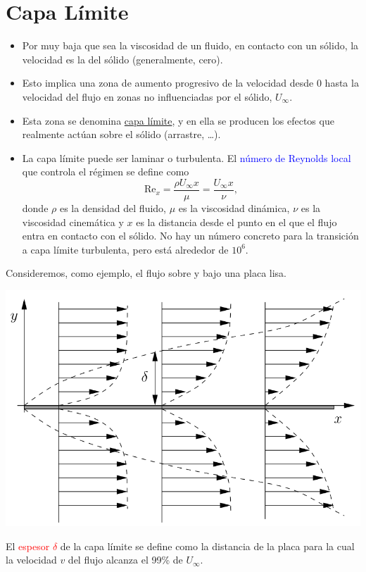 \chapter{Capa Límite}
	
	\begin{itemize}
		\item Por muy baja que sea la viscosidad de un fluido, en contacto con un
		sólido, la velocidad es la del sólido (generalmente, cero).
		\item Esto implica una zona de aumento progresivo de la velocidad desde
		0 hasta la velocidad del flujo en zonas no influenciadas por el sólido,
		$U_{\infty}$.
		\item Esta zona se denomina \textcolor{red}{\href{https://en.wikipedia.org/wiki/Boundary_layer}{capa límite}},
		y en ella se producen los efectos que realmente actúan sobre el sólido
		(arrastre, \ldots ).
		\item La capa límite puede ser laminar o turbulenta. El \textcolor{blue}{número
			de Reynolds local} que controla el régimen se define como 
		\[
		\text{Re}_{x}=\frac{\rho U_{\infty}x}{\mu}=\frac{U_{\infty}x}{\nu},
		\]
		donde $\rho$ es la densidad del fluido, $\mu$ es la viscosidad
		dinámica, $\nu$ es la viscosidad cinemática y $x$ es la distancia
		desde el punto en el que el flujo entra en contacto con el sólido.
		No hay un número concreto para la transición a capa límite turbulenta,
		pero está alrededor de $10^{6}$.
	\end{itemize}

	Consideremos, como ejemplo, el flujo sobre y bajo una placa lisa.

\begin{center}
	\includegraphics[width=0.7\linewidth]{TeX_files/chapter08-CapaLimite/capa1}
\end{center}
	
	
	El \textcolor{red}{espesor $\delta$} de la capa límite se define
	como la distancia de la placa para la cual la velocidad $v$ del flujo
	alcanza el 99\% de $U_{\infty}$.
	
